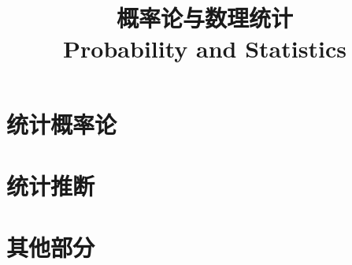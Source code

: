 \documentclass{../thunote}
\begin{document}
\title{概率论与数理统计\\Probability and Statistics}
\maketitle

\frontmatter
\tableofcontents


\mainmatter
\part{统计概率论}







\part{统计推断}







\part{其他部分}




\appendix


\end{document}
